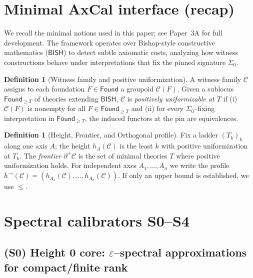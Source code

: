 \documentclass[11pt]{article}
\theoremstyle{plain}
\theoremstyle{definition}
\newtheorem{definition}[theorem]{Definition}
\theoremstyle{remark}
\newcommand{\BISH}{\mathsf{BISH}}
\newcommand{\Found}{\mathsf{Found}}
\newcommand{\SigmaZero}{\Sigma_{0}}
\newcommand{\Frontierpos}{\partial^{+}}
\begin{document}
\section{Minimal AxCal interface (recap)}

We recall the minimal notions used in this paper; see Paper~3A \cite{Paper3A} for full development. The framework operates over Bishop-style constructive mathematics ($\BISH$) to detect subtle axiomatic costs, analyzing how witness constructions behave under interpretations that fix the pinned signature $\SigmaZero$.

\begin{definition}[Witness family and positive uniformization]
A witness family $\mathcal{C}$ assigns to each foundation $F\in\Found$ a groupoid $\mathcal{C}(F)$.
Given a sublocus $\Found_{\ge T}$ of theories extending $\BISH$, $\mathcal{C}$ is \emph{positively uniformizable at $T$}
if (i) $\mathcal{C}(F)$ is nonempty for all $F\in \Found_{\ge T}$ and (ii) for every $\SigmaZero$--fixing interpretation in $\Found_{\ge T}$,
the induced functors at the pin are equivalences.
\end{definition}

\begin{definition}[Height, Frontier, and Orthogonal profile]
Fix a ladder $(T_k)_k$ along one axis $A$; the height $h_A(\mathcal{C})$ is the least $k$ with positive uniformization at $T_k$.
The \emph{frontier} $\Frontierpos\mathcal{C}$ is the set of minimal theories $T$ where positive uniformization holds.
For independent axes $A_1,\dots,A_n$ we write the profile
$h^{\to}(\mathcal{C})=(h_{A_1}(\mathcal{C}),\ldots,h_{A_n}(\mathcal{C}))$. If only an upper bound is established, we use $\le$.
\end{definition}

\section{Spectral calibrators S0--S4}

\subsection{(S0) Height 0 core: $\varepsilon$--spectral approximations for compact/finite rank}
\end{document}
